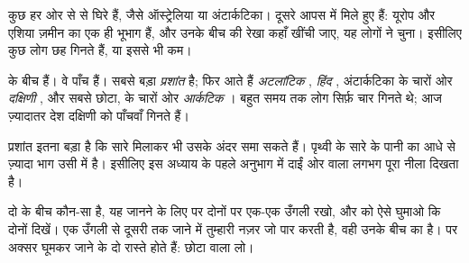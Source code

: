 \begin{remark}[एक महाद्वीप कहाँ ख़त्म होता है?]\label{rem:g3:continents-and-oceans:where}
कुछ  हर ओर से  से घिरे हैं, जैसे ऑस्ट्रेलिया या अंटार्कटिका।
दूसरे आपस में मिले हुए हैं: यूरोप और एशिया ज़मीन का एक ही भूभाग हैं, और
उनके बीच की रेखा कहाँ खींची जाए, यह लोगों ने चुना। इसीलिए कुछ लोग छह
 गिनते हैं, या इससे भी कम।
\end{remark}

 के बीच  हैं। वे पाँच हैं। सबसे बड़ा \emph{प्रशांत
} है; फिर आते हैं \emph{अटलांटिक }, \emph{हिंद },
अंटार्कटिका के चारों ओर \emph{दक्षिणी }, और सबसे छोटा,  के
चारों ओर \emph{आर्कटिक }। बहुत समय तक लोग सिर्फ़ चार गिनते थे; आज
ज़्यादातर देश दक्षिणी  को पाँचवाँ गिनते हैं।

\begin{example}[प्रशांत महासागर कितना बड़ा है?]\label{ex:g3:continents-and-oceans:pacific}
प्रशांत  इतना बड़ा है कि सारे  मिलाकर भी उसके अंदर समा सकते
हैं। पृथ्वी के सारे  के पानी का आधे से ज़्यादा भाग उसी में है। इसीलिए
इस अध्याय के पहले अनुभाग में दाईं ओर वाला  लगभग पूरा नीला दिखता है।
\end{example}

\begin{method}[दो महाद्वीपों के बीच के महासागर का नाम बताना]\label{met:g3:continents-and-oceans:between}
दो  के बीच कौन-सा  है, यह जानने के लिए  पर दोनों पर
एक-एक उँगली रखो, और  को ऐसे घुमाओ कि दोनों दिखें। एक उँगली से दूसरी तक
जाने में तुम्हारी नज़र जो  पार करती है, वही उनके बीच का  है।
 पर अक्सर घूमकर जाने के दो रास्ते होते हैं: छोटा वाला लो।
\end{method}

